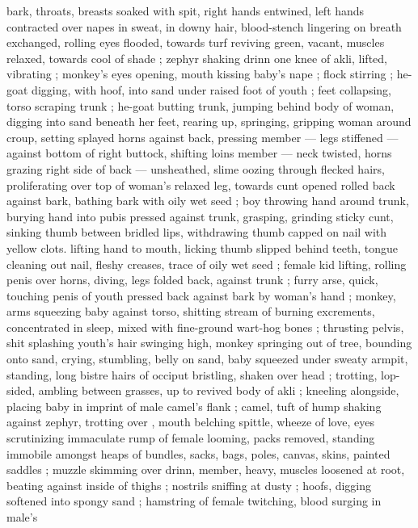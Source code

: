 bark, throats, breasts soaked with spit, right hands entwined, left 
hands contracted over napes in sweat, in downy hair, blood-stench 
lingering on breath exchanged, rolling eyes flooded, towards turf 
reviving green, vacant, muscles relaxed, towards cool of shade ; 
zephyr shaking drinn {\col} one knee of akli, lifted, vibrating ; monkey's 
eyes opening, mouth kissing baby's nape ; flock stirring ; he-goat 
digging, with hoof, into sand under raised foot of youth ; feet 
collapsing, torso scraping trunk ; he-goat butting trunk, jumping 
behind body of woman, digging into sand beneath her feet, rearing 
up, springing, gripping woman around croup, setting splayed horns 
against back, pressing member --- legs stiffened --- against bottom 
of right buttock, shifting loins {\col} member --- neck twisted, horns 
grazing right side of back --- unsheathed, slime oozing through 
flecked hairs, proliferating over top of woman's relaxed leg, towards 
cunt opened rolled back against bark, bathing bark with oily wet seed 
; boy throwing hand around trunk, burying hand into pubis pressed 
against trunk, grasping, grinding sticky cunt, sinking thumb between 
bridled lips, withdrawing thumb capped on nail with yellow clots. 
lifting hand to mouth, licking thumb slipped behind teeth, tongue 
cleaning out nail, fleshy creases, trace of oily wet seed ; female kid 
lifting, rolling penis over horns, diving, legs folded back, against 
trunk ; furry arse, quick, touching penis of youth pressed back 
against bark by woman's hand ; monkey, arms squeezing baby 
against torso, shitting stream of burning excrements, concentrated 
in sleep, mixed with fine-ground wart-hog bones ; thrusting pelvis, 
shit splashing youth's hair swinging high, monkey springing out of 
tree, bounding onto sand, crying, stumbling, belly on sand, baby 
squeezed under sweaty armpit, standing, long bistre hairs of occiput 
bristling, shaken over head ; trotting, lop-sided, ambling between 
grasses, up to revived body of akli ; kneeling alongside, placing baby 
in imprint of male camel's flank ; camel, tuft of hump shaking against 
zephyr, trotting over , mouth belching spittle, wheeze of love, 
eyes scrutinizing immaculate rump of female looming, packs 
removed, standing immobile amongst heaps of bundles, sacks, bags, 
poles, canvas, skins, painted saddles ; muzzle skimming over drinn, 
member, heavy, muscles loosened at root, beating against inside of 
thighs ; nostrils sniffing at dusty  ; hoofs, digging softened into 
spongy sand ; hamstring of female twitching, blood surging in male's 
